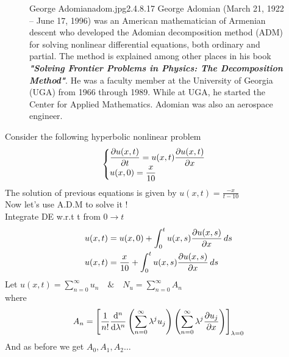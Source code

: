 \documentclass[]{article}
\begin{document}
\begin{figure}[b]
    \begin{enrichment}{George Adomian}{adom.jpg}{2.4}{.8}{.17}
        George Adomian (March 21, 1922 – June 17, 1996) 
        was an American mathematician of Armenian descent 
        who developed the Adomian decomposition method (ADM) 
        for solving nonlinear differential equations, 
        both ordinary and partial. 
        The method is explained among other places
        in his book \textit{\textbf{"Solving Frontier Problems in Physics: 
        The Decomposition Method"}}.
        He was a faculty member at the University of Georgia 
        (UGA) from 1966 through 1989. While at UGA, 
        he started the Center for Applied Mathematics. 
        Adomian was also an aerospace engineer.
    \end{enrichment}    
\end{figure}
\newpage
Consider the following hyperbolic nonlinear problem\\
\begin{equation}
    \begin{cases}
         \displaystyle \pdv{u(x,t)}{t} =  u(x,t)\pdv{u(x,t)}{ x}
         \\
         \displaystyle u(x,0) = \frac{x}{10}
     \end{cases}
 \end{equation}
 The solution of previous equations is given by $u(x,t)=\frac{-x}{t-10}$\\
 Now let’s use A.D.M to solve it !\\
 Integrate DE w.r.t t from $0\rightarrow t$\\
 \begin{align*}
    u(x,t) &= u(x,0) + \int_0^t u(x,s) \pdv{u(x,s)}{x} \, ds\\
    u(x,t) &= \frac{x}{10} + \int_0^t u(x,s) \pdv{u(x,s)}{x} \, ds\\
 \end{align*}
 Let $u(x,t) = \sum_{n=0}^{\infty} u_n \quad \& \quad N_u = \sum_{n=0}^{\infty} A_n$\\
 where
 \begin{equation*}
    A_n = \left[ \frac{1}{n!} \dv[n]{}{\lambda}  \left( \sum_{n=0}^{\infty} \lambda^j u_j \right) \left( \sum_{n=0}^{\infty}\lambda^j \pdv{u_j}{x} \right) \right]_{\lambda = 0}
 \end{equation*}
 And as before we get $A_0,A_1,A_2\dots$
\end{document}

